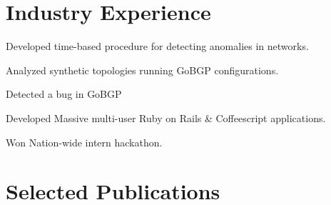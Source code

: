 \documentclass[]{deedy-resume-openfont}
\begin{document}
\begin{minipage}[t]{0.66\textwidth} 


\section{Industry Experience}

\vspace{\topsep}
\begin{tightemize}
\item Developed time-based procedure for detecting anomalies in networks.
\item Analyzed synthetic topologies running GoBGP configurations.
\item Detected a bug in GoBGP
\end{tightemize}
 \sectionsep
{}
\begin{tightemize}
  \item Developed Massive multi-user Ruby on Rails \& Coffeescript applications.
  \item Won Nation-wide intern hackathon.
\end{tightemize}
\sectionsep



\section{Selected Publications}





\end{minipage}
\end{document}
